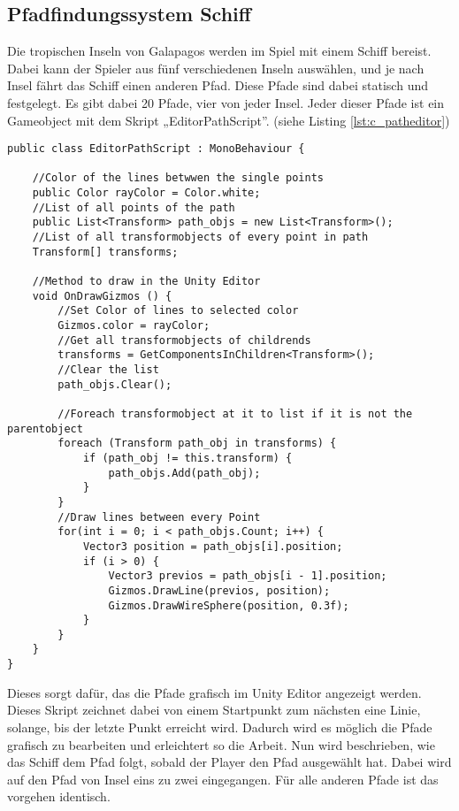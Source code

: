 \subsection{Pfadfindungssystem Schiff}
Die tropischen Inseln von Galapagos werden im Spiel mit einem Schiff bereist. Dabei kann der Spieler aus fünf verschiedenen Inseln auswählen, und je nach Insel fährt das Schiff einen anderen Pfad. Diese Pfade sind dabei statisch und festgelegt. Es gibt dabei 20 Pfade, vier von jeder Insel. Jeder dieser Pfade ist ein Gameobject mit dem Skript „EditorPathScript”. (siehe Listing \ref{lst:c_patheditor})

\begin{scriptsize}
\lstset{
	float,
	caption=Skript EditorPathScript.cs, 
	language=[Sharp]C, 
	frame=single,  
	showstringspaces=false, 
	showspaces=false, 
	numbers=left, 
	captionpos=b, 
	belowcaptionskip=4pt,
	basicstyle=\ttfamily
} 
\newpage
\begin{lstlisting}[label=lst:c_patheditor]
public class EditorPathScript : MonoBehaviour {

    //Color of the lines betwwen the single points
    public Color rayColor = Color.white;
    //List of all points of the path
    public List<Transform> path_objs = new List<Transform>();
    //List of all transformobjects of every point in path
    Transform[] transforms;

    //Method to draw in the Unity Editor
    void OnDrawGizmos () {
        //Set Color of lines to selected color
        Gizmos.color = rayColor;
        //Get all transformobjects of childrends
        transforms = GetComponentsInChildren<Transform>();
        //Clear the list
        path_objs.Clear();

        //Foreach transformobject at it to list if it is not the parentobject
        foreach (Transform path_obj in transforms) {
            if (path_obj != this.transform) {
                path_objs.Add(path_obj);
            }
        }
        //Draw lines between every Point
        for(int i = 0; i < path_objs.Count; i++) {
            Vector3 position = path_objs[i].position;
            if (i > 0) {
                Vector3 previos = path_objs[i - 1].position;
                Gizmos.DrawLine(previos, position);
                Gizmos.DrawWireSphere(position, 0.3f);
            }
        }
    }
}

\end{lstlisting}
\end{scriptsize}

Dieses sorgt dafür, das die Pfade grafisch im Unity Editor angezeigt werden. Dieses Skript zeichnet dabei von einem Startpunkt zum nächsten eine Linie, solange, bis der letzte Punkt erreicht wird. Dadurch wird es möglich die Pfade grafisch zu bearbeiten und erleichtert so die Arbeit. 
Nun wird beschrieben, wie das Schiff dem Pfad folgt, sobald der Player den Pfad ausgewählt hat. Dabei wird auf den Pfad von Insel eins zu zwei eingegangen. Für alle anderen Pfade ist das vorgehen identisch.

